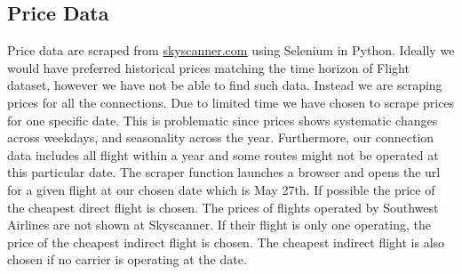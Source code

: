 \subsection{Price Data}
Price data are scraped from \url{skyscanner.com} using Selenium in Python. Ideally we would have preferred historical prices matching the time horizon of Flight dataset, however we have not be able to find such data. Instead we are scraping prices for all the connections. Due to limited time we have chosen to scrape prices for one specific date. This is problematic since prices shows systematic changes across weekdays, and seasonality across the year. Furthermore, our connection data includes all flight within a year and some routes might not be operated at this particular date.
The scraper function launches a browser and opens the url for a given flight at our chosen date which is May 27th. If possible the price of the cheapest direct flight is chosen. The prices of flights operated by Southwest Airlines are not shown at Skyscanner. If their flight is only one operating, the price of the cheapest indirect flight is chosen. The cheapest indirect flight is also chosen if no carrier is operating at the date.


